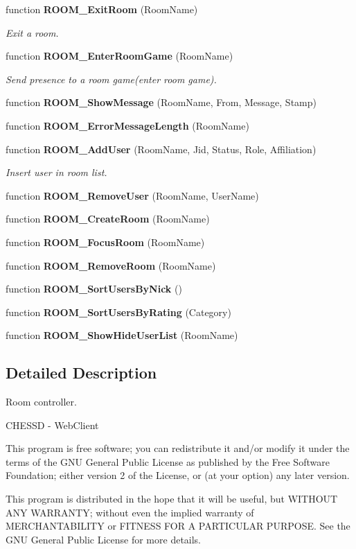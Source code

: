\begin{CompactItemize}
function {\bf ROOM\_\-ExitRoom} (RoomName)
\begin{CompactList}\small\item\em Exit a room. \item\end{CompactList}\item 
function {\bf ROOM\_\-EnterRoomGame} (RoomName)
\begin{CompactList}\small\item\em Send presence to a room game(enter room game). \item\end{CompactList}\item 
function {\bf ROOM\_\-ShowMessage} (RoomName, From, Message, Stamp)
\item 
function {\bf ROOM\_\-ErrorMessageLength} (RoomName)
\item 
function {\bf ROOM\_\-AddUser} (RoomName, Jid, Status, Role, Affiliation)
\begin{CompactList}\small\item\em Insert user in room list. \item\end{CompactList}\item 
function {\bf ROOM\_\-RemoveUser} (RoomName, UserName)
\item 
function {\bf ROOM\_\-CreateRoom} (RoomName)
\item 
function {\bf ROOM\_\-FocusRoom} (RoomName)
\item 
function {\bf ROOM\_\-RemoveRoom} (RoomName)
\item 
function {\bf ROOM\_\-SortUsersByNick} ()
\item 
function {\bf ROOM\_\-SortUsersByRating} (Category)
\item 
function {\bf ROOM\_\-ShowHideUserList} (RoomName)
\end{CompactItemize}


\subsection{Detailed Description}
Room controller. 

CHESSD - WebClient

This program is free software; you can redistribute it and/or modify it under the terms of the GNU General Public License as published by the Free Software Foundation; either version 2 of the License, or (at your option) any later version.

This program is distributed in the hope that it will be useful, but WITHOUT ANY WARRANTY; without even the implied warranty of MERCHANTABILITY or FITNESS FOR A PARTICULAR PURPOSE. See the GNU General Public License for more details.

